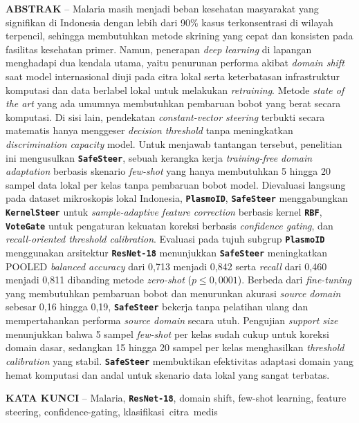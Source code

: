 \documentclass[conference]{IEEEtran}
\newcommand{\nama}[1]{\textbf{\texttt{#1}}}
\begin{document}
{
\noindent \textbf{ABSTRAK} -- Malaria masih menjadi beban kesehatan masyarakat yang signifikan di Indonesia dengan lebih dari 90\% kasus terkonsentrasi di wilayah terpencil, sehingga membutuhkan metode skrining yang cepat dan konsisten pada fasilitas kesehatan primer. Namun, penerapan \textit{deep learning} di lapangan menghadapi dua kendala utama, yaitu penurunan performa akibat \textit{domain shift} saat model internasional diuji pada citra lokal serta keterbatasan infrastruktur komputasi dan data berlabel lokal untuk melakukan \textit{retraining}. Metode \textit{state of the art} yang ada umumnya membutuhkan pembaruan bobot yang berat secara komputasi. Di sisi lain, pendekatan \textit{constant-vector steering} terbukti secara matematis hanya menggeser \textit{decision threshold} tanpa meningkatkan \textit{discrimination capacity} model. Untuk menjawab tantangan tersebut, penelitian ini mengusulkan \nama{SafeSteer}, sebuah kerangka kerja \textit{training-free domain adaptation} berbasis skenario \textit{few-shot} yang hanya membutuhkan 5 hingga 20 sampel data lokal per kelas tanpa pembaruan bobot model. Dievaluasi langsung pada dataset mikroskopis lokal Indonesia, \nama{PlasmoID}, \nama{SafeSteer} menggabungkan \nama{KernelSteer} untuk \textit{sample-adaptive feature correction} berbasis kernel \nama{RBF}, \nama{VoteGate} untuk pengaturan kekuatan koreksi berbasis \textit{confidence gating}, dan \textit{recall-oriented threshold calibration}. Evaluasi pada tujuh subgrup \nama{PlasmoID} menggunakan arsitektur \nama{ResNet-18} menunjukkan \nama{SafeSteer} meningkatkan POOLED \textit{balanced accuracy} dari 0,713 menjadi 0,842 serta \textit{recall} dari 0,460 menjadi 0,811 dibanding metode \textit{zero-shot} ($p \leq 0{,}0001$). Berbeda dari \textit{fine-tuning} yang membutuhkan pembaruan bobot dan menurunkan akurasi \textit{source domain} sebesar 0,16 hingga 0,19, \nama{SafeSteer} bekerja tanpa pelatihan ulang dan mempertahankan performa \textit{source domain} secara utuh. Pengujian \textit{support size} menunjukkan bahwa 5 sampel \textit{few-shot} per kelas sudah cukup untuk koreksi domain dasar, sedangkan 15 hingga 20 sampel per kelas menghasilkan \textit{threshold calibration} yang stabil. \nama{SafeSteer} membuktikan efektivitas adaptasi domain yang hemat komputasi dan andal untuk skenario data lokal yang sangat terbatas.
\vspace{0.8em}

\noindent \textbf{KATA KUNCI} -- Malaria, \nama{ResNet-18}, domain shift, few-shot learning, feature steering, confidence-gating, \mbox{klasifikasi citra medis}

}
\end{document}
